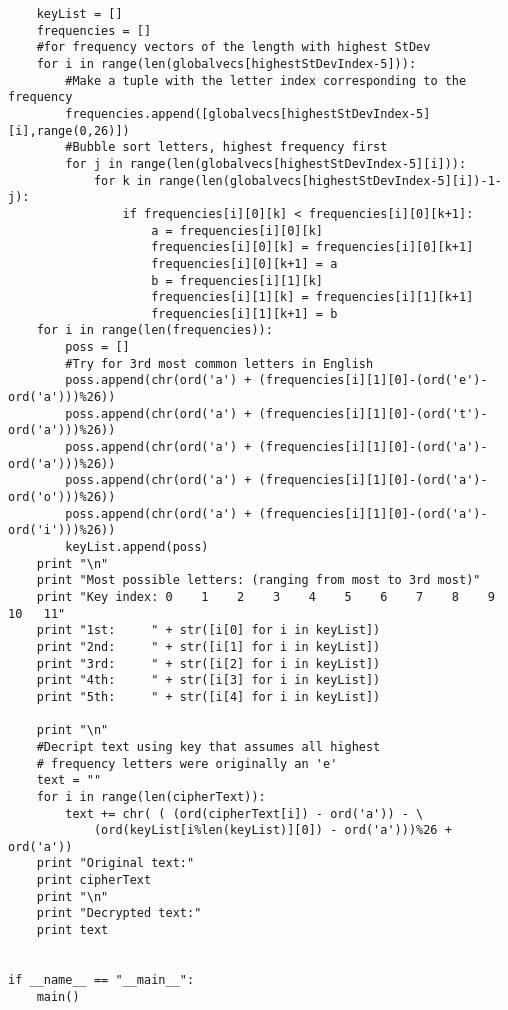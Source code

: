 \documentclass[a4paper]{article}
\begin{document}
\begin{lstlisting}
	keyList = []
	frequencies = []
	#for frequency vectors of the length with highest StDev
	for i in range(len(globalvecs[highestStDevIndex-5])):
		#Make a tuple with the letter index corresponding to the frequency
		frequencies.append([globalvecs[highestStDevIndex-5][i],range(0,26)])
		#Bubble sort letters, highest frequency first
		for j in range(len(globalvecs[highestStDevIndex-5][i])):
			for k in range(len(globalvecs[highestStDevIndex-5][i])-1-j):
				if frequencies[i][0][k] < frequencies[i][0][k+1]:
					a = frequencies[i][0][k]
					frequencies[i][0][k] = frequencies[i][0][k+1]
					frequencies[i][0][k+1] = a
					b = frequencies[i][1][k]
					frequencies[i][1][k] = frequencies[i][1][k+1]
					frequencies[i][1][k+1] = b
	for i in range(len(frequencies)):
		poss = []
		#Try for 3rd most common letters in English
		poss.append(chr(ord('a') + (frequencies[i][1][0]-(ord('e')-ord('a')))%26))
		poss.append(chr(ord('a') + (frequencies[i][1][0]-(ord('t')-ord('a')))%26))
		poss.append(chr(ord('a') + (frequencies[i][1][0]-(ord('a')-ord('a')))%26))
		poss.append(chr(ord('a') + (frequencies[i][1][0]-(ord('a')-ord('o')))%26))
		poss.append(chr(ord('a') + (frequencies[i][1][0]-(ord('a')-ord('i')))%26))
		keyList.append(poss)
	print "\n"
	print "Most possible letters: (ranging from most to 3rd most)"
	print "Key index: 0    1    2    3    4    5    6    7    8    9    10   11"
	print "1st:     " + str([i[0] for i in keyList])
	print "2nd:     " + str([i[1] for i in keyList])
	print "3rd:     " + str([i[2] for i in keyList])
	print "4th:     " + str([i[3] for i in keyList])
	print "5th:     " + str([i[4] for i in keyList])

	print "\n"
	#Decript text using key that assumes all highest
	# frequency letters were originally an 'e'
	text = ""
	for i in range(len(cipherText)):
		text += chr( ( (ord(cipherText[i]) - ord('a')) - \
			(ord(keyList[i%len(keyList)][0]) - ord('a')))%26 + ord('a'))
	print "Original text:"
	print cipherText
	print "\n"
	print "Decrypted text:"
	print text
	

if __name__ == "__main__":
    main()
\end{lstlisting}


\end{document}
